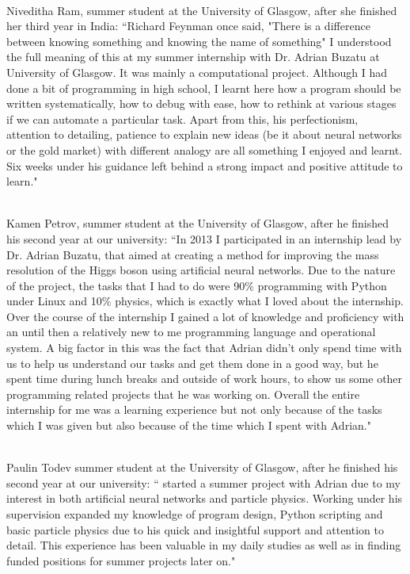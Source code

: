 \documentclass[12pt]{article} %
\begin{document}
\begin{appendices}
\ \\Niveditha Ram, summer student at the University of Glasgow, after she finished her third year in India: ``Richard Feynman once said, "There is a difference between knowing something and knowing the name of something" I understood the full meaning of this at my summer internship with Dr. Adrian Buzatu at University of Glasgow. It was mainly a computational project. Although I had done a bit of programming in high school, I learnt here how a program should be written systematically, how to debug with ease, how to rethink at various stages if we can automate a particular task. Apart from this, his perfectionism, attention to detailing, patience to explain new ideas (be it about neural networks or the gold market) with different analogy are all something I enjoyed and learnt. Six weeks under his guidance left behind a strong impact and positive attitude to learn."

\ \\Kamen Petrov, summer student at the University of Glasgow, after he finished his second year at our university: ``In 2013 I participated in an internship lead by Dr. Adrian Buzatu, that aimed at creating a method for improving the mass resolution of the Higgs boson using artificial neural networks. Due to the nature of the project, the tasks that I had to do were 90\% programming with Python under Linux and 10\% physics, which is exactly what I loved about the internship. Over the course of the internship I gained a lot of knowledge and proficiency with an until then a relatively new to me programming language and operational system. A big factor in this was the fact that Adrian didn't only spend time with us to help us understand our tasks and get them done in a good way, but he spent time during lunch breaks and outside of work hours, to show us some other programming related projects that he was working on. Overall the entire internship for me was a learning experience but not only because of the tasks which I  was given but also because of the time which I spent with Adrian."

\ \\Paulin Todev summer student at the University of Glasgow, after he finished his second year at our university: `` started a summer project with Adrian due to my interest in both artificial neural networks and particle physics. Working under his supervision expanded my knowledge of program design, Python scripting and basic particle physics due to his quick and insightful support and attention to detail. This experience has been valuable in my daily studies as well as in finding funded positions for summer projects later on."


\end{appendices}
\end{document}
